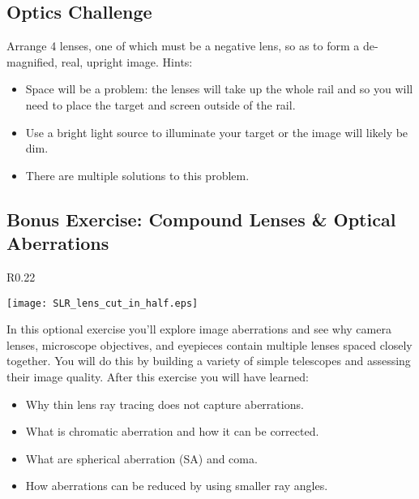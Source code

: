 \documentclass[a4paper]{report}
\begin{document}
	\clearpage
	
	
	\subsection{Optics Challenge}
	Arrange 4 lenses, one of which must be a negative lens, so as to form a de-magnified, real, upright image. Hints: 
	\begin{itemize}
		\item Space will be a problem: the lenses will take up the whole rail and so you will need to place the target and screen outside of the rail.
		\item Use a bright light source to illuminate your target or the image will likely be dim. 
		\item There are multiple solutions to this problem.
	\end{itemize}
	
	
	
	
	\subsection{Bonus Exercise: Compound Lenses \& Optical Aberrations}
	\begin{wrapfigure}{R}{0.22\textwidth}
		\begin{center}
			\texttt{[image: SLR\_lens\_cut\_in\_half.eps]}
			
		\end{center}
		\vspace{-100pt} 
	\end{wrapfigure}
	In this optional exercise you'll explore image aberrations and see why camera lenses, microscope objectives, and eyepieces contain multiple lenses spaced closely together. 
	You will do this by building a variety of simple telescopes and assessing their image quality.
	After this exercise you will have learned:
	\begin{itemize}
		\setlength\itemsep{0.15em}
		\item Why thin lens ray tracing does not capture aberrations.
		\item What is chromatic aberration and how it can be corrected.
		\item What are spherical aberration (SA) and coma.
		\item How aberrations can be reduced by using smaller ray angles.
	\end{itemize}
	
	
\end{document}
